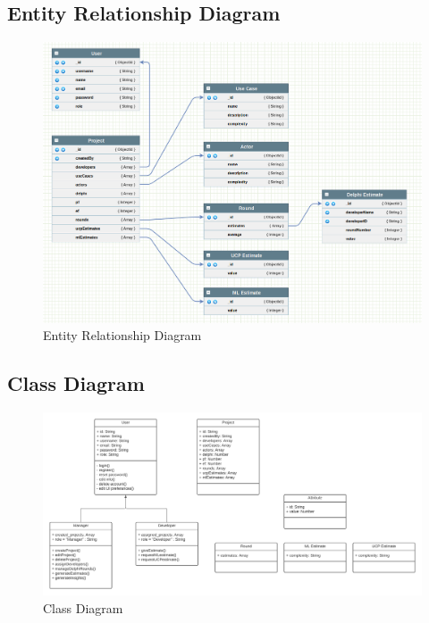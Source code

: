 \subsection{Entity Relationship Diagram}
\begin{figure}[H]
    \centering
    \includegraphics[scale=0.6]{./diagrams/ERD.png}
    \caption{Entity Relationship Diagram}
    \label{fig:er-diag}

\end{figure}

\newpage







\subsection{Class Diagram}
\begin{figure}[H]
    \centering
    \includegraphics[scale=0.5]{./diagrams/class-diagram.png}
    \caption{Class Diagram}
    \label{fig:class-diag}
\end{figure}


